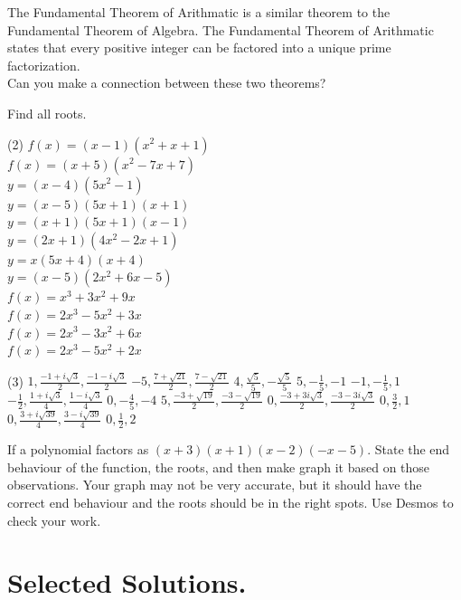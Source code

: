 \documentclass[12pt,fleqn]{book}
\newcommand{\prb}[1]{\begin{Exercise}#1\end{Exercise}}
\newcommand{\sol}[1]{\begin{Answer}#1\end{Answer}}
\begin{document}
\prb{The Fundamental Theorem of Arithmatic is a similar theorem to the Fundamental Theorem of Algebra.  The Fundamental Theorem of Arithmatic states that every positive integer can be factored into a unique prime factorization.
	\\[1em]
	Can you make a connection between these two theorems?
	\\[5em]}

\prb{Find all roots.
	\begin{tasks}(2)
		\task  $f(x)=(x-1)\left(x^2+x+1\right)$
		\\[10em]
		\task  $f(x)=(x+5)\left(x^2-7 x+7\right)$
		\\[10em]
		\task  $y=(x-4)\left(5 x^2-1\right)$
		\\[10em]
		\task  $y=(x-5)(5 x+1)(x+1)$
		\\[10em]
		\task  $y=(x+1)(5 x+1)(x-1)$
		\\[10em]
		\task  $y=(2 x+1)\left(4 x^2-2 x+1\right)$
		\\[10em]
		\task  $y=x(5 x+4)(x+4)$
		\\[10em]
		\task  $y=(x-5)\left(2 x^2+6 x-5\right)$
		\\[10em]
		\task  $f(x)=x^3+3 x^2+9 x$
		\\[10em]
		\task  $f(x)=2 x^3-5 x^2+3 x$
		\\[10em]
		\task  $f(x)=2 x^3-3 x^2+6 x$
		\\[10em]
		\task  $f(x)=2 x^3-5 x^2+2 x$
		\\[10em]
	\end{tasks}
}
\sol{
	\begin{tasks}(3)
		\task $1, \frac{-1+i \sqrt{3}}{2}, \frac{-1-i \sqrt{3}}{2}$
		\task $-5, \frac{7+\sqrt{21}}{2}, \frac{7-\sqrt{21}}{2}$
		\task $4, \frac{\sqrt{5}}{5},-\frac{\sqrt{5}}{5}$
		\task $5,-\frac{1}{5},-1$
		\task $-1,-\frac{1}{5}, 1$
		\task $-\frac{1}{2}, \frac{1+i \sqrt{3}}{4}, \frac{1-i \sqrt{3}}{4}$
		\task $0,-\frac{4}{5},-4$
		\task $5, \frac{-3+\sqrt{19}}{2}, \frac{-3-\sqrt{19}}{2}$
		\task $0, \frac{-3+3 i \sqrt{3}}{2}, \frac{-3-3 i \sqrt{3}}{2}$
		\task $0, \frac{3}{2}, 1$
		\task $0, \frac{3+i \sqrt{39}}{4}, \frac{3-i \sqrt{39}}{4}$
		\task $0, \frac{1}{2}, 2$
	\end{tasks}
}

\prb{If a polynomial factors as $(x+3)(x+1)(x-2)(-x-5)$.  State the end behaviour of the function, the roots, and then make graph it based on those observations.  Your graph may not be very accurate, but it should have the correct end behaviour and the roots should be in the right spots.  Use Desmos to check your work.}


\chapter{Selected Solutions.}
\shipoutAnswer
\end{document}
